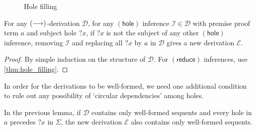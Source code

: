 \documentclass[twoside]{report}
\begin{document}
\begin{figure}[ht]
    \centering
\caption{Hole filling}
\label{fig:focused_calculus_hole_filling}
\end{figure}

\begin{proposition}
\label{thm:focused_calculus_hole_filling}
For any $(\longrightarrow)$-derivation $\mathcal D$, for any $(\mathsf{hole})$ inference $\mathcal I \in \mathcal D$ with premise proof term $a$ and subject hole ${?x}$, if ${?x}$ is not the subject of any other $(\mathsf{hole})$ inference, removing $\mathcal I$ and replacing all ${?x}$ by $a$ in $\mathcal D$ gives a new derivation $\mathcal E$.
\end{proposition}

\begin{proof}
By simple induction on the structure of $\mathcal D$. For $(\mathsf{reduce})$ inferences, use \cref{thm:hole_filling}.
\end{proof}

In order for the derivations to be well-formed, we need one additional condition to rule out any possibility of `circular dependencies' among holes. %

\begin{proposition}
\label{thm:focused_calculus_hole_filling_well_formed}
In the previous lemma, if $\mathcal D$ contains only well-formed sequents and every hole in $a$ precedes ${?x}$ in $\Sigma$, the new derivation $\mathcal E$ also contains only well-formed sequents.
\end{proposition}
\end{document}
